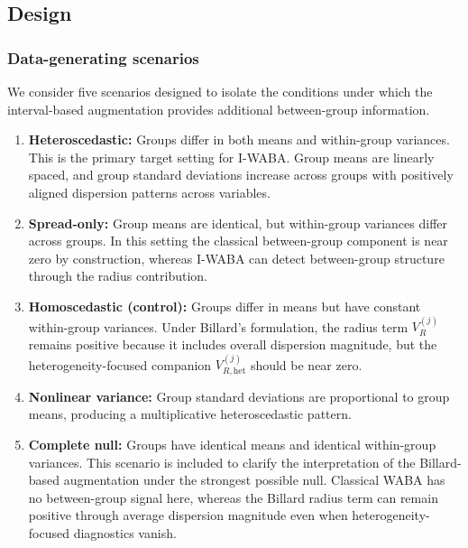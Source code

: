 \documentclass[preprint, times, 12pt, authoryear]{elsarticle}
\begin{document}
\subsection{Design}

\subsubsection{Data-generating scenarios}

We consider five scenarios designed to isolate the conditions under which the interval-based augmentation provides additional between-group information.

\begin{enumerate}
	\item \textbf{Heteroscedastic:} Groups differ in both means and within-group variances. This is the primary target setting for I-WABA. Group means are linearly spaced, and group standard deviations increase across groups with positively aligned dispersion patterns across variables.
	
	\item \textbf{Spread-only:} Group means are identical, but within-group variances differ across groups. In this setting the classical between-group component is near zero by construction, whereas I-WABA can detect between-group structure through the radius contribution.
	
	\item \textbf{Homoscedastic (control):} Groups differ in means but have constant within-group variances. Under Billard's formulation, the radius term $V_R^{(j)}$ remains positive because it includes overall dispersion magnitude, but the heterogeneity-focused companion $V_{R,\mathrm{het}}^{(j)}$ should be near zero.
	
	\item \textbf{Nonlinear variance:} Group standard deviations are proportional to group means, producing a multiplicative heteroscedastic pattern.
	
	\item \textbf{Complete null:} Groups have identical means and identical within-group variances. This scenario is included to clarify the interpretation of the Billard-based augmentation under the strongest possible null. Classical WABA has no between-group signal here, whereas the Billard radius term can remain positive through average dispersion magnitude even when heterogeneity-focused diagnostics vanish.
\end{enumerate}
\end{document}
